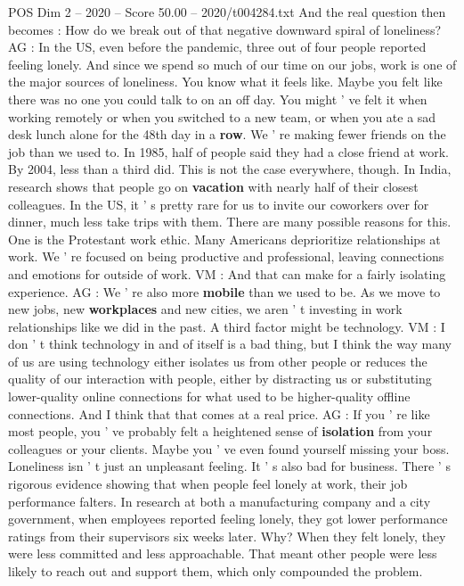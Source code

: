 \begin{textsample}{POS Dim 2 – 2020 – Score 50.00 – 2020/t004284.txt}
And the real question then becomes : How do we break out of that negative downward spiral of loneliness?
AG : In the US, even before the pandemic, three out of four people reported feeling lonely.
And since we spend so much of our time on our jobs, work is one of the major sources of loneliness.
You know what it feels like.
Maybe you felt like there was no one you could talk to on an off day.
You might ' ve felt it when working remotely or when you switched to a new team, or when you ate a sad desk lunch alone for the 48th day in a \textbf{row}.
We ' re making fewer friends on the job than we used to.
In 1985, half of people said they had a close friend at work.
By 2004, less than a third did.
This is not the case everywhere, though.
In India, research shows that people go on \textbf{vacation} with nearly half of their closest colleagues.
In the US, it ' s pretty rare for us to invite our coworkers over for dinner, much less take trips with them.
There are many possible reasons for this.
One is the Protestant work ethic.
Many Americans deprioritize relationships at work.
We ' re focused on being productive and professional, leaving connections and emotions for outside of work.
VM : And that can make for a fairly isolating experience.
AG : We ' re also more \textbf{mobile} than we used to be.
As we move to new jobs, new \textbf{workplaces} and new cities, we aren ' t investing in work relationships like we did in the past.
A third factor might be technology.
VM : I don ' t think technology in and of itself is a bad thing, but I think the way many of us are using technology either isolates us from other people or reduces the quality of our interaction with people, either by distracting us or substituting lower-quality online connections for what used to be higher-quality offline connections.
And I think that that comes at a real price.
AG : If you ' re like most people, you ' ve probably felt a heightened sense of \textbf{isolation} from your colleagues or your clients.
Maybe you ' ve even found yourself missing your boss.
Loneliness isn ' t just an unpleasant feeling.
It ' s also bad for business.
There ' s rigorous evidence showing that when people feel lonely at work, their job performance falters.
In research at both a manufacturing company and a city government, when employees reported feeling lonely, they got lower performance ratings from their supervisors six weeks later.
Why?
When they felt lonely, they were less committed and less approachable.
That meant other people were less likely to reach out and support them, which only compounded the problem.

\end{textsample}
